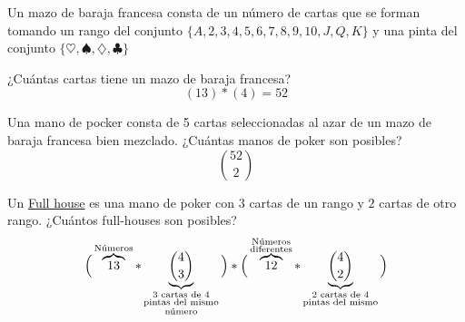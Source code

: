 \documentclass[../main.tex]{subfiles}
\begin{document}

%
%
%
%
%
Un mazo de baraja francesa consta de un número de cartas que se forman tomando
un rango del conjunto $\{A,2,3,4,5,6,7,8,9,10,J,Q,K\}$
y una pinta del conjunto $\{\heartsuit,\spadesuit,\diamondsuit,\clubsuit\}$

¿Cuántas cartas tiene un mazo de baraja francesa?
\[
	(13)*(4)=52
\]

Una mano de pocker consta de 5 cartas seleccionadas al azar de un mazo de baraja francesa bien mezclado.
¿Cuántas manos de poker son posibles?
\[
	\binom{52}{2}
\]

Un \underline{Full house} es una mano de poker con $3$ cartas de un rango y $2$
cartas de otro rango.
¿Cuántos full-houses son posibles?
\[
	\Big{(}
	\overbrace{13}^{\text{Números}}
	*
	\underbrace{ \binom{4}{3} }_{\substack{\text{$3$ cartas de $4$}\\ \text{pintas del mismo}\\
	\text{número}} }
	\Big{)}
	*
	\Big{(}
	\overbrace{12}^{\substack{\text{Números}\\\text{diferentes}} }
	*
	\underbrace{ \binom{4}{2} }_{\substack{\text{$2$ cartas de $4$}\\ \text{pintas del mismo}} }
	\Big{)}
\]
\end{document}
